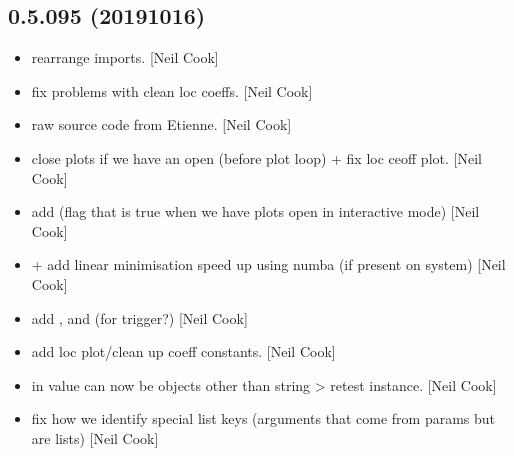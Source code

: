 \documentclass[a4paper,10pt,english]{report}
\begin{document}
\subsection{0.5.095 (2019\sphinxhyphen{}10\sphinxhyphen{}16)}
\label{\detokenize{misc/changelog:id66}}\begin{itemize}
\item {} 
 \sphinxhyphen{} rearrange imports. {[}Neil Cook{]}

\item {} 
 \sphinxhyphen{} fix problems with clean loc coeffs.
{[}Neil Cook{]}

\item {} 
 \sphinxhyphen{} raw source code from Etienne. {[}Neil Cook{]}

\item {} 
 \sphinxhyphen{} close plots if we have an open (before
plot loop) + fix loc ceoff plot. {[}Neil Cook{]}

\item {} 
 \sphinxhyphen{} add  (flag that is true when we have
plots open in interactive mode) {[}Neil Cook{]}

\item {} 
 +  \sphinxhyphen{} add linear minimisation speed up
using numba (if present on system) {[}Neil Cook{]}

\item {} 
 \sphinxhyphen{} add ,
 and  (for trigger?) {[}Neil Cook{]}

\item {} 
 \sphinxhyphen{} add loc plot/clean up coeff
constants. {[}Neil Cook{]}

\item {} 
 \sphinxhyphen{} in  value can now be objects other
than string \textendash{}\textgreater{} re\sphinxhyphen{}test instance. {[}Neil Cook{]}

\item {} 
 \sphinxhyphen{} fix how we identify special list keys
(arguments that come from params but are lists) {[}Neil Cook{]}


\end{itemize}
\end{document}
